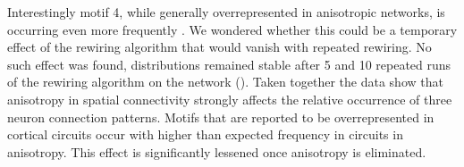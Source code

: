Interestingly motif 4, while generally overrepresented in anisotropic
networks, is occurring even more frequently . We wondered whether this
could be a temporary effect of the rewiring algorithm that would
vanish with repeated rewiring. No such effect was found, distributions
remained stable after 5 and 10 repeated runs of the rewiring algorithm
on the network (). Taken together the
data show that anisotropy in spatial connectivity strongly affects the
relative occurrence of three neuron connection patterns. Motifs that
are reported to be overrepresented in cortical circuits occur with
higher than expected frequency in circuits in anisotropy. This effect
is significantly lessened once anisotropy is eliminated.












